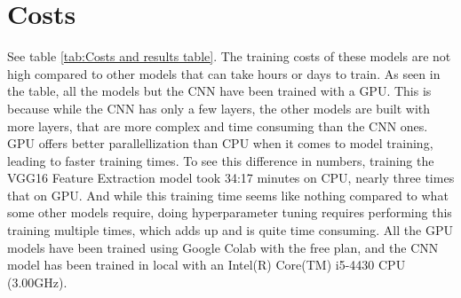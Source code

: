 \documentclass[11pt, a4paper]{article}
\begin{document}
\begin{figure}[H]
\begin{minipage}{.5\textwidth}
  \label{fig:results-resnet50-ft}
\end{minipage}
\end{figure}

\section{Costs}
See table \ref{tab:Costs and results table}. The training costs of these models are not high compared to other models that can take hours or days to train. As seen in the table, all the models but the CNN have been trained with a GPU. This is because while the CNN has only a few layers, the other models are built with more layers, that are more complex and time consuming than the CNN ones. GPU offers better parallellization than CPU when it comes to model training, leading to faster training times. To see this difference in numbers, training the VGG16 Feature Extraction model took 34:17 minutes on CPU, nearly three times that on GPU. And while this training time seems like nothing compared to what some other models require, doing hyperparameter tuning requires performing this training multiple times, which adds up and is quite time consuming. All the GPU models have been trained using Google Colab with the free plan, and the CNN model has been trained in local with an Intel(R) Core(TM) i5-4430 CPU (3.00GHz).
\end{document}

